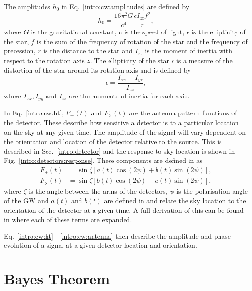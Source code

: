 The amplitudes $h_0$ in Eq.~\ref{intro:cw:amplitudes} are defined by
\begin{equation}
    h_0 = \frac{16 \pi^2 G}{c^4} \frac{\epsilon I_{zz} f^2}{r},
\end{equation}
where $G$ is the gravitational constant, $c$ is the speed of light, $\epsilon$ is the ellipticity of the star, $f$ is the sum of the frequency of rotation of the star and the frequency of precession, $r$ is the distance to the star and $I_{zz}$ is the moment of inertia with respect to the rotation axis $z$.
The ellipticity of the star $\epsilon$ is a measure of the distortion of the star around its rotation axis and is defined by
\begin{equation}
    \epsilon = \frac{I_{xx} - I_{yy}}{I_{zz}},
\end{equation}
where $I_{xx}, I_{yy}$ and $I_{zz}$ are the moments of inertia for each axis.

In Eq.~\ref{intro:cw:ht}, $F_+(t)$ and $F_{\times}(t)$ are the antenna pattern functions of the detector. 
These describe how sensitive a detector is to a particular location on the sky at any given time. 
The amplitude of the signal will vary dependent on the orientation and location of the detector relative to the source.
This is described in Sec.~\ref{intro:detector} and the response to sky location is shown in Fig.~\ref{intro:detectors:response}.
These components are defined in \citep{schutz1998DataAnalysis} as
\begin{equation}
\label{intro:cw:antenna}
\begin{split}
F_{+}(t) &= \sin{\zeta}[a(t)\cos{(2\psi)} + b(t)\sin{(2\psi)}], \\
F_{\times}(t) &= \sin{\zeta}[b(t) \cos{(2\psi)} - a(t)\sin{(2\psi)}],
\end{split}
\end{equation}
where $\zeta$ is the angle between the arms of the detectors, $\psi$ is the polarisation angle of the \gls{GW} and $a(t)$ and $b(t)$ are defined in \citep{schutz1998DataAnalysis} and relate the sky location to the orientation of the detector at a given time. 
A full derivation of this can be found in \citep{schutz1998DataAnalysis} where each of these terms are expanded.

Eq.~\ref{intro:cw:ht} - \ref{intro:cw:antenna} then describe the amplitude and phase evolution of a signal at a given detector location and orientation.



\section{\label{intro:prob} Bayes Theorem}

